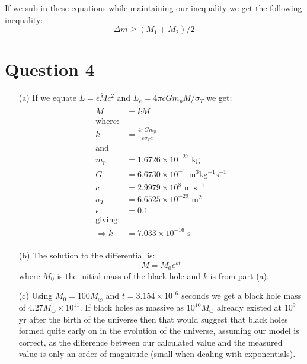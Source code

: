 \documentclass[10pt,a4paper]{article}
\begin{document}
If we sub in these equations while maintaining our inequality we get the following inequality:
\begin{equation*}
    \Delta m \geq (M_{1}+M_{2})/2
\end{equation*}

\section*{Question 4}
\begin{itemize}
    \item[(a)] If we equate $L=\epsilon \dot M c^{2}$ and $L_{e}=4\pi c G m_{p} M / \sigma_{T}$ we get:
    \begin{align*}
        \dot M &= k M \\
        \mbox{where:}& \\
        k &= \frac{4 \pi G m_{p}}{\epsilon \sigma_{T}c} \\
        \mbox{and }& \\
        m_{p} &= 1.6726 \times 10^{-27} \mbox{ kg} \\
        G &= 6.6730 \times 10^{-11} \mbox{m$^{3}$kg$^{-1}$s$^{-1}$} \\
        c &= 2.9979 \times 10^{8} \mbox { m s$^{-1}$} \\
        \sigma_{T} &= 6.6525 \times 10^{-29} \mbox{ m$^{2}$} \\
        \epsilon &= 0.1 \\
        \mbox{giving:}& \\
        \Rightarrow k &= 7.033 \times 10^{-16} \mbox{ s} \\
    \end{align*}
    \item[(b)] The solution to the differential is:
    \begin{equation*}
        M = M_{0}e^{kt}
    \end{equation*}
    where $M_{0}$ is the initial mass of the black hole and $k$ is from part (a).
    \item[(c)] Using $M_{0} = 100 M_{\odot}$ and $t = 3.154 \times 10^{16}$ seconds we get a black hole mass of $4.27 M_{\odot} \times 10^{11}$. If black holes as massive as $10^{10}M_{\odot}$ already existed at $10^{9}$ yr after the birth of the universe then that would suggest that black holes formed quite early on in the evolution of the universe, assuming our model is correct, as the difference between our calculated value and the measured value is only an order of magnitude (small when dealing with exponentials).
\end{itemize}
\end{document}
